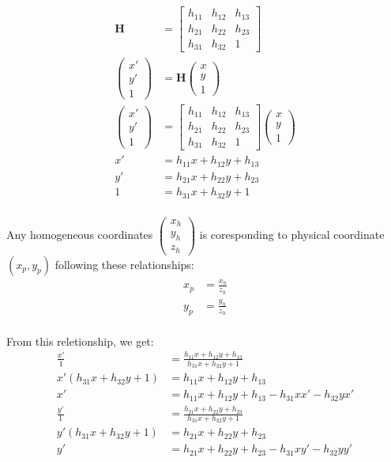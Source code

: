 \documentclass[11pt]{article}
\begin{document}
\begin{align*}
\mathbf{H} &= 
\begin{bmatrix}
h_{11} & h_{12} & h_{13}\\
h_{21} & h_{22} & h_{23} \\
h_{31} & h_{32} & 1
\end{bmatrix} \\
\begin{pmatrix} x'\\ y'\\ 1\end{pmatrix} &= 
\mathbf{H} 
\begin{pmatrix} x\\ y\\ 1\end{pmatrix} \\
\begin{pmatrix} x'\\ y'\\ 1\end{pmatrix} &= 
\begin{bmatrix}
h_{11} & h_{12} & h_{13}\\
h_{21} & h_{22} & h_{23} \\
h_{31} & h_{32} & 1
\end{bmatrix}
\begin{pmatrix} x\\ y\\ 1\end{pmatrix} \\
x' &= h_{11}x + h_{12}y + h_{13}\\
y' &= h_{21}x + h_{22}y + h_{23}\\
1 &= h_{31}x + h_{32}y + 1\\
\end{align*}

Any homogeneous coordinates $\begin{pmatrix} x_h\\ y_h\\ z_h\end{pmatrix}$ is coresponding to physical coordinate $(x_p,y_p)$ following these relationships:
\begin{align*}
x_p &= \frac{x_h}{z_h}\\
y_p &= \frac{y_h}{z_h}\\
\end{align*}

From this reletionship, we get:
\begin{align*}
\frac{x'}{1} &= \frac{ h_{11}x + h_{12}y + h_{13}}{h_{31}x + h_{32}y + 1}\\
x'(h_{31}x + h_{32}y + 1) &= h_{11}x + h_{12}y + h_{13} \\
x' &= h_{11}x + h_{12}y + h_{13} - h_{31}xx' -  h_{32}yx' \\
\frac{y'}{1} &= \frac{ h_{21}x + h_{22}y + h_{23}}{h_{31}x + h_{32}y + 1}\\
y'(h_{31}x + h_{32}y + 1) &= h_{21}x + h_{22}y + h_{23} \\
y' &= h_{21}x + h_{22}y + h_{23} - h_{31}xy' -  h_{32}yy' \\
\end{align*}
\end{document}
